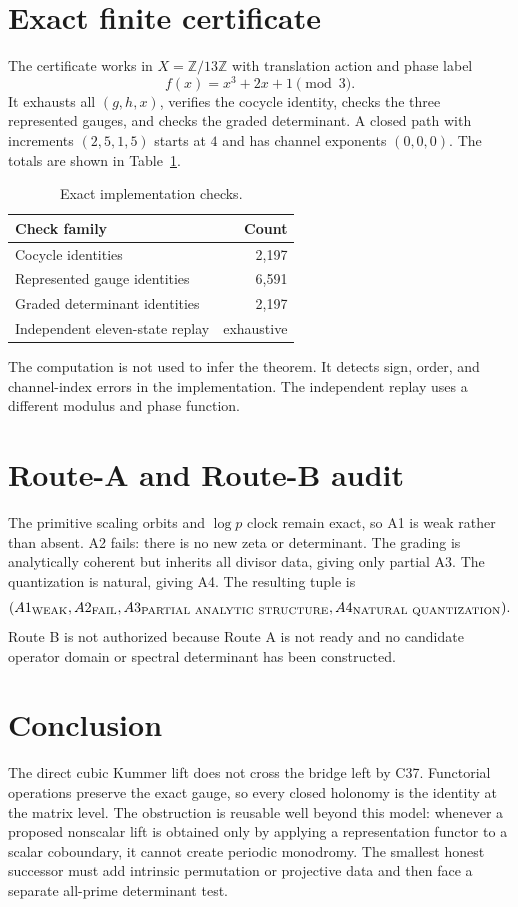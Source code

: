 \documentclass[11pt]{article}
\theoremstyle{definition}\newtheorem{definition}[theorem]{Definition}
\theoremstyle{remark}\newtheorem{remark}[theorem]{Remark}
\begin{document}
\section{Exact finite certificate}
The certificate works in \(X=\mathbb Z/13\mathbb Z\) with translation action
and phase label
\[
 f(x)=x^3+2x+1\pmod 3.
\]
It exhausts all \((g,h,x)\), verifies the cocycle identity, checks the three
represented gauges, and checks the graded determinant.  A closed path with
increments \((2,5,1,5)\) starts at \(4\) and has channel exponents
\((0,0,0)\).  The totals are shown in Table~\ref{tab:checks}.

\begin{table}[h]
\centering
\caption{Exact implementation checks.}\label{tab:checks}
\begin{tabular}{lr}
\toprule
Check family & Count\\
\midrule
Cocycle identities & 2,197\\
Represented gauge identities & 6,591\\
Graded determinant identities & 2,197\\
Independent eleven-state replay & exhaustive\\
\bottomrule
\end{tabular}
\end{table}

The computation is not used to infer the theorem.  It detects sign, order,
and channel-index errors in the implementation.  The independent replay
uses a different modulus and phase function.

\section{Route-A and Route-B audit}
The primitive scaling orbits and \(\log p\) clock remain exact, so A1 is
weak rather than absent.  A2 fails: there is no new zeta or determinant.
The grading is analytically coherent but inherits all divisor data, giving
only partial A3.  The quantization is natural, giving A4.  The resulting
tuple is
\[
 (A1_{\rm WEAK},A2_{\rm FAIL},
 A3_{\rm PARTIAL\ ANALYTIC\ STRUCTURE},A4_{\rm NATURAL\ QUANTIZATION}).
\]
Route B is not authorized because Route A is not ready and no candidate
operator domain or spectral determinant has been constructed.

\section{Conclusion}
The direct cubic Kummer lift does not cross the bridge left by C37.
Functorial operations preserve the exact gauge, so every closed holonomy is
the identity at the matrix level.  The obstruction is reusable well beyond
this model: whenever a proposed nonscalar lift is obtained only by applying
a representation functor to a scalar coboundary, it cannot create periodic
monodromy.  The smallest honest successor must add intrinsic permutation or
projective data and then face a separate all-prime determinant test.



\end{document}
